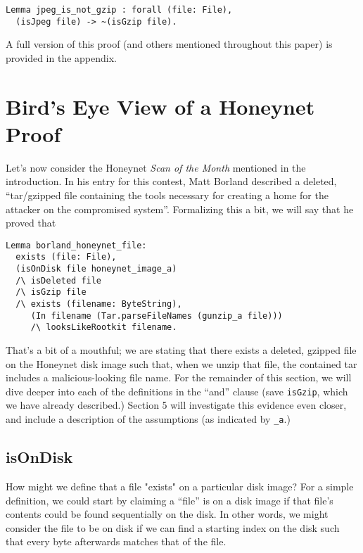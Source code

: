 \documentclass[nocopyrightspace]{sigplanconf}
\begin{document}
\begin{lstlisting}
Lemma jpeg_is_not_gzip : forall (file: File),
  (isJpeg file) -> ~(isGzip file).
\end{lstlisting}

A full version of this proof (and others mentioned throughout this paper) is
provided in the appendix.

\section{Bird's Eye View of a Honeynet Proof}

Let's now consider the Honeynet {\it Scan of the Month} mentioned in the
introduction. In his entry for this contest, Matt 
Borland\cite{borland-honeynet} described a deleted, ``tar/gzipped file
containing the tools necessary for creating a home for the attacker on the
compromised system''. Formalizing this a bit, we will say that he proved that

\begin{lstlisting}
Lemma borland_honeynet_file:
  exists (file: File),
  (isOnDisk file honeynet_image_a)
  /\ isDeleted file
  /\ isGzip file
  /\ exists (filename: ByteString),
     (In filename (Tar.parseFileNames (gunzip_a file)))
     /\ looksLikeRootkit filename.
\end{lstlisting}

That's a bit of a mouthful; we are stating that there exists a deleted,
gzipped file on the Honeynet disk image such that, when we unzip that file,
the contained tar includes a malicious-looking file name. For the remainder of
this section, we will dive deeper into each of the definitions in the ``and''
clause (save {\tt isGzip}, which we have already described.) Section 5 will
investigate this evidence even closer, and include a description of the
assumptions (as indicated by {\tt \_a}.)

\subsection{isOnDisk}

How might we define that a file "exists" on a particular disk image? For a
simple definition, we could start by claiming a ``file'' is on a disk image if
that file's contents could be found sequentially on the disk. In other words,
we might consider the file to be on disk if we can find a starting index on
the disk such that every byte afterwards matches that of the file.
\end{document}
